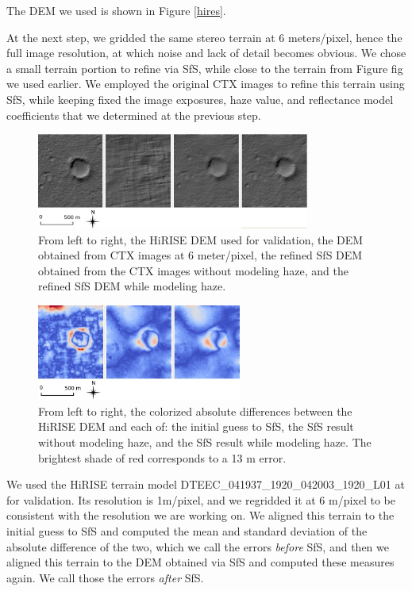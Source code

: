 \documentclass[draft,linenumbers]{agujournal}
\begin{document}
The DEM we used is shown in Figure \ref{hires}. 

At the next step, we gridded the same stereo terrain at 6 meters/pixel, hence the full image resolution, at which noise and lack of detail becomes obvious. We chose a small terrain portion to refine via SfS, while close to the terrain from Figure fig we used earlier. We employed the original CTX images to refine this terrain using SfS, while keeping fixed the image exposures, haze value, and reflectance model coefficients that we determined at the previous step.   

\begin{figure}[h!]
\centering
\includegraphics[width=0.8\textwidth]{sfs_mars_fig2}
\caption[sfs]{From left to right, the HiRISE DEM used for validation, the DEM obtained from CTX images at 6 meter/pixel, the refined SfS DEM obtained from the CTX images without modeling haze, and the refined SfS DEM while modeling haze.}
\label{sfs2}
\end{figure}

\begin{figure}[h!]
\centering
\includegraphics[width=0.6\textwidth]{sfs_mars_fig3}
\caption[sfs]{From left to right, the colorized absolute differences between the HiRISE DEM and each of: the initial guess to SfS, the SfS result without modeling haze, and the SfS result while modeling haze. The brightest shade of red corresponds to a 13 m error.}
\label{sfs3}
\end{figure}

We used the HiRISE terrain model DTEEC\_041937\_1920\_042003\_1920\_L01 at for validation. Its resolution is 1m/pixel, and we regridded it at 6 m/pixel to be consistent with the resolution we are working on. We aligned this terrain to the initial guess to SfS and computed the mean and standard deviation of the absolute difference of the two, which we call the errors \textit{before} SfS, and then we aligned this terrain to the DEM obtained via SfS and computed these measures again. We call those the errors \textit{after} SfS. 
\end{document}
